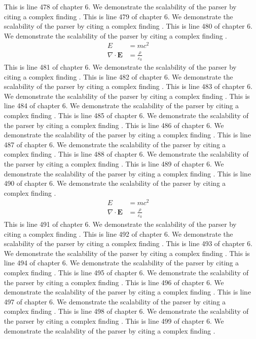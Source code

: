 This is line 478 of chapter 6. We demonstrate the scalability of the parser by citing a complex finding \cite{ref6_478}.
This is line 479 of chapter 6. We demonstrate the scalability of the parser by citing a complex finding \cite{ref6_479}.
This is line 480 of chapter 6. We demonstrate the scalability of the parser by citing a complex finding \cite{ref6_480}.
\begin{align*}
  E &= mc^2 \\
  \nabla \cdot \mathbf{E} &= \frac{\rho}{\varepsilon_0}
\end{align*}
This is line 481 of chapter 6. We demonstrate the scalability of the parser by citing a complex finding \cite{ref6_481}.
This is line 482 of chapter 6. We demonstrate the scalability of the parser by citing a complex finding \cite{ref6_482}.
This is line 483 of chapter 6. We demonstrate the scalability of the parser by citing a complex finding \cite{ref6_483}.
This is line 484 of chapter 6. We demonstrate the scalability of the parser by citing a complex finding \cite{ref6_484}.
This is line 485 of chapter 6. We demonstrate the scalability of the parser by citing a complex finding \cite{ref6_485}.
This is line 486 of chapter 6. We demonstrate the scalability of the parser by citing a complex finding \cite{ref6_486}.
This is line 487 of chapter 6. We demonstrate the scalability of the parser by citing a complex finding \cite{ref6_487}.
This is line 488 of chapter 6. We demonstrate the scalability of the parser by citing a complex finding \cite{ref6_488}.
This is line 489 of chapter 6. We demonstrate the scalability of the parser by citing a complex finding \cite{ref6_489}.
This is line 490 of chapter 6. We demonstrate the scalability of the parser by citing a complex finding \cite{ref6_490}.
\begin{align*}
  E &= mc^2 \\
  \nabla \cdot \mathbf{E} &= \frac{\rho}{\varepsilon_0}
\end{align*}
This is line 491 of chapter 6. We demonstrate the scalability of the parser by citing a complex finding \cite{ref6_491}.
This is line 492 of chapter 6. We demonstrate the scalability of the parser by citing a complex finding \cite{ref6_492}.
This is line 493 of chapter 6. We demonstrate the scalability of the parser by citing a complex finding \cite{ref6_493}.
This is line 494 of chapter 6. We demonstrate the scalability of the parser by citing a complex finding \cite{ref6_494}.
This is line 495 of chapter 6. We demonstrate the scalability of the parser by citing a complex finding \cite{ref6_495}.
This is line 496 of chapter 6. We demonstrate the scalability of the parser by citing a complex finding \cite{ref6_496}.
This is line 497 of chapter 6. We demonstrate the scalability of the parser by citing a complex finding \cite{ref6_497}.
This is line 498 of chapter 6. We demonstrate the scalability of the parser by citing a complex finding \cite{ref6_498}.
This is line 499 of chapter 6. We demonstrate the scalability of the parser by citing a complex finding \cite{ref6_499}.
